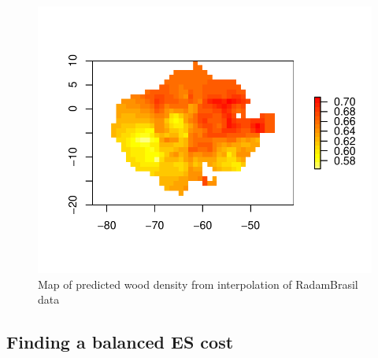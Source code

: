 \documentclass{article}
\begin{document}
\begin{figure}
    \centering
    \includegraphics[width=0.7\linewidth]{graphs/map_WDext.pdf}
    \caption{Map of predicted wood density from interpolation of RadamBrasil data}
    \label{sfig:wdext}
\end{figure}

\subsection{Finding a balanced ES cost}
\end{document}

